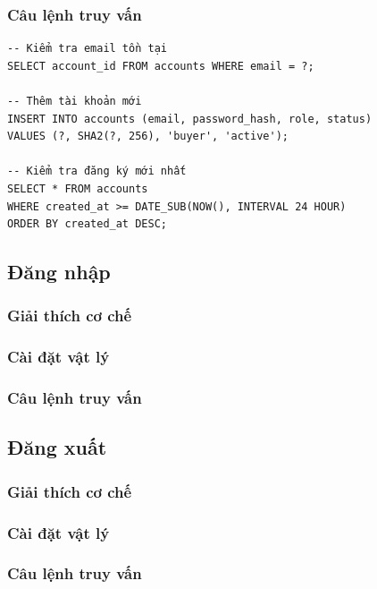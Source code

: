 \subsubsection{Câu lệnh truy vấn}

\begin{verbatim}
-- Kiểm tra email tồn tại
SELECT account_id FROM accounts WHERE email = ?;

-- Thêm tài khoản mới
INSERT INTO accounts (email, password_hash, role, status)
VALUES (?, SHA2(?, 256), 'buyer', 'active');

-- Kiểm tra đăng ký mới nhất
SELECT * FROM accounts 
WHERE created_at >= DATE_SUB(NOW(), INTERVAL 24 HOUR)
ORDER BY created_at DESC;
\end{verbatim}

\subsection{Đăng nhập}

\subsubsection{Giải thích cơ chế}

\subsubsection{Cài đặt vật lý}

\subsubsection{Câu lệnh truy vấn}

\subsection{Đăng xuất}

\subsubsection{Giải thích cơ chế}

\subsubsection{Cài đặt vật lý}

\subsubsection{Câu lệnh truy vấn}

